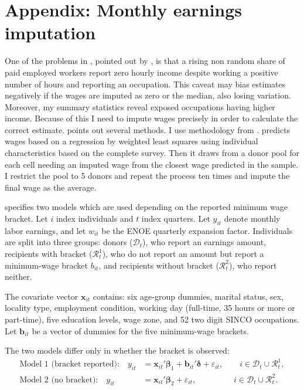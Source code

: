 \section{Appendix: Monthly earnings imputation}

One of the problems in , pointed out by \cite{imput}, is that a rising non random share of paid employed workers report zero hourly income despite working a positive number of hours and reporting an occupation. This caveat may bias estimates negatively if the wages are imputed as zero or the median, also losing variation. Moreover, my summary statistics reveal exposed occupations having higher income. Because of this I need to impute wages precisely in order to calculate the correct estimate. \cite{imput} points out several methods. I use methodology from \cite{conasami2023imputacion}.  predicts wages based on a regression by weighted least squares using individual characteristics based on the complete survey. Then it draws from a donor pool for each cell needing an imputed wage from the closest wage predicted in the sample. I restrict the pool to 5 donors and repeat the process ten times and impute the final wage as the average.

\cite{conasami2023imputacion} specifies two models which are used depending on the reported minimum wage bracket.
Let $i$ index individuals and $t$ index quarters. Let $y_{it}$ denote monthly labor earnings, and let $w_{it}$ be the ENOE quarterly expansion factor. Individuals are split into three groups: donors ($\mathcal{D}_t$), who report an earnings amount, recipients with bracket ($\mathcal{R}^{1}_t$), who do not report an amount but report a minimum-wage bracket $b_{it}$, and recipients without bracket ($\mathcal{R}^{2}_t$), who report neither.

The covariate vector $\mathbf{x}_{it}$ contains: six age-group dummies, marital status, sex, locality type, employment condition, working day (full-time, 35 hours or more or part-time), five education levels, wage zone, and 52 two digit SINCO occupations. Let $\mathbf{b}_{it}$ be a vector of dummies for the five minimum-wage brackets.

The two models differ only in whether the bracket is observed:
\begin{align}
    \text{Model 1 (bracket reported):} \quad y_{it} & = \mathbf{x}_{it}'\boldsymbol{\beta}_1 + \mathbf{b}_{it}'\boldsymbol{\delta} + \varepsilon_{it}, \qquad i \in \mathcal{D}_t \cup \mathcal{R}^{1}_t, \label{eq:model1} \\[4pt]
    \text{Model 2 (no bracket):} \quad y_{it}       & = \mathbf{x}_{it}'\boldsymbol{\beta}_2 + \varepsilon_{it}, \qquad\qquad\;\; i \in \mathcal{D}_t \cup \mathcal{R}^{2}_t. \label{eq:model2}
\end{align}
